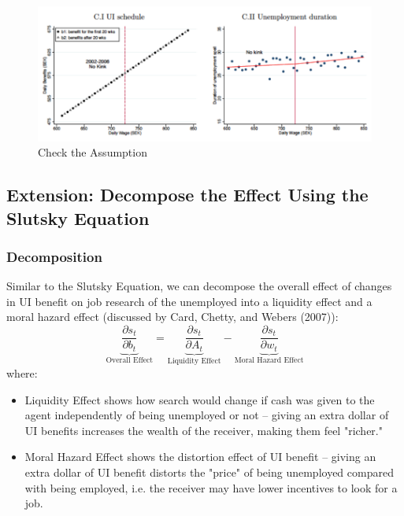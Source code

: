         \begin{figure}[H]
            \centering
            \includegraphics[width = 6 in]{images/ch1/RKD_3.png}
            \caption{Check the Assumption}
            \label{fig:RKD_3}
        \end{figure}
        
        \subsection{Extension: Decompose the Effect Using the Slutsky Equation}
            \subsubsection{Decomposition}
                Similar to the Slutsky Equation, we can decompose the overall effect of changes in UI benefit on job research of the unemployed into a liquidity effect and a moral hazard effect (discussed by Card, Chetty, and Webers (2007)):
                $$\underbrace{\frac{\partial s_t}{\partial b_t}}_{\text{Overall\ Effect}} = \underbrace{\frac{\partial s_t}{\partial A_t}}_{\text{Liquidity\ Effect}} - \underbrace{\frac{\partial s_t}{\partial w_t}}_{\text{Moral\ Hazard\ Effect}}$$
                where:
                \begin{itemize}
                    \item Liquidity Effect shows how search would change if cash was given to the agent independently of being unemployed or not -- giving an extra dollar of UI benefits increases the wealth of the receiver, making them feel "richer."
                    \item Moral Hazard Effect shows the distortion effect of UI benefit -- giving an extra dollar of UI benefit distorts the "price" of being unemployed compared with being employed, i.e. the receiver may have lower incentives to look for a job.
                \end{itemize}
